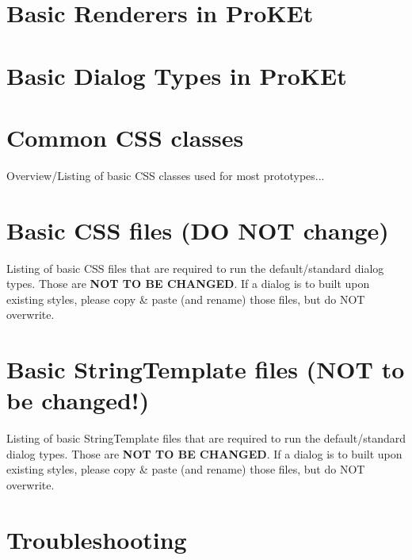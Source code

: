\documentclass[a4paper,10pt]{scrreprt}
\begin{document}
\chapter{Basic Renderers in ProKEt}\label{apprenderers}

\chapter{Basic Dialog Types in ProKEt}\label{appdialogtypes}

\chapter{Common CSS classes} \label{appcss}
Overview/Listing of basic CSS classes used for most prototypes...

\chapter{Basic CSS files (DO NOT change)}  \label{appcssBase}
Listing of basic CSS files that are required to run the default/standard dialog types.
Those are \textbf{NOT TO BE CHANGED}. 
If a dialog is to built upon existing styles, please copy \& paste (and rename) those files, but do NOT overwrite.

\chapter{Basic StringTemplate files (NOT to be changed!)} \label{appstBase}
Listing of basic StringTemplate files that are required to run the default/standard dialog types.
Those are \textbf{NOT TO BE CHANGED}. 
If a dialog is to built upon existing styles, please copy \& paste (and rename) those files, but do NOT overwrite.

\chapter{Troubleshooting}
\end{document}
